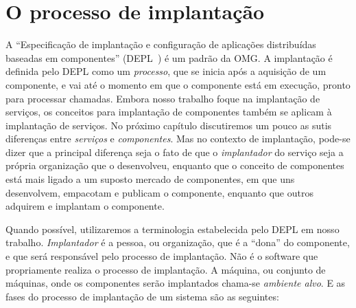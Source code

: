 \chapter{O processo de implantação}
\label{cap:implantacao}

A ``Especificação de implantação e configuração de aplicações distribuídas baseadas em componentes'' (DEPL~\cite{DEPL2006}) é um padrão da OMG. 
A implantação é definida pelo DEPL como um \emph{processo}, que se inicia após a aquisição de um componente, e vai até o momento em que o componente está em execução, pronto para processar chamadas. 
Embora nosso trabalho foque na implantação de serviços, os conceitos para implantação de componentes também se aplicam à implantação de serviços. No próximo capítulo discutiremos um pouco as sutis diferenças entre \emph{serviços} e \emph{componentes}.
Mas no contexto de implantação, pode-se dizer que a principal diferença seja o fato de que o \emph{implantador} do serviço seja a própria organização que o desenvolveu, enquanto que o conceito de componentes está mais ligado a um suposto mercado de componentes, em que uns desenvolvem, empacotam e publicam o componente, enquanto que outros adquirem e implantam o componente.

Quando possível, utilizaremos a terminologia estabelecida pelo DEPL em nosso trabalho.
\emph{Implantador} é a pessoa, ou organização, que é a ``dona'' do componente, e que será responsável pelo processo de implantação. Não é o software que propriamente realiza o processo de implantação. A máquina, ou conjunto de máquinas, onde os componentes serão implantados chama-se \emph{ambiente alvo}. E as fases do processo de implantação de um sistema são as seguintes:


